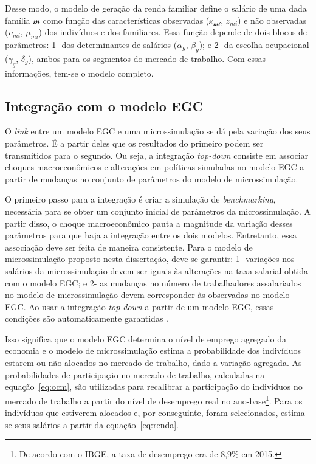 Desse modo, o modelo de geração da renda familiar define o salário de uma dada família $\mathcal{m}$ como função das características observadas ($\mathcal{x_{mi}}$, $z_{mi}$) e não observadas ($\upsilon_{mi}$, $\mu_{mi}$) dos indivíduos e dos familiares. Essa função depende de dois blocos de parâmetros: 1- dos determinantes de salários ($\alpha_g$, $\beta_g$); e 2- da escolha ocupacional ($\gamma_g$, $\delta_g$), ambos para os segmentos do mercado de trabalho. Com essas informações, tem-se o modelo completo.


\subsection{Integração com o modelo EGC}\label{subsec:integracao}

O \textit{link} entre um modelo EGC e uma microssimulação se dá pela variação dos seus parâmetros. É a partir deles que os resultados do primeiro podem ser transmitidos para o segundo. Ou seja, a integração \textit{top-down} consiste em associar choques macroeconômicos e alterações em políticas simuladas no modelo EGC a partir de mudanças no conjunto de parâmetros do modelo de microssimulação.

O primeiro passo para a integração é criar a simulação de \textit{benchmarking}, necessária para se obter um conjunto inicial de parâmetros da microssimulação. A partir disso, o choque macroeconômico pauta a magnitude da variação desses parâmetros para que haja a integração entre os dois modelos. Entretanto, essa associação deve ser feita de maneira consistente. Para o modelo de microssimulação proposto nesta dissertação, deve-se garantir: 1- variações nos salários da microssimulação devem ser iguais às alterações na taxa salarial obtida com o modelo EGC; e 2- as mudanças no número de trabalhadores assalariados no modelo de microssimulação devem corresponder às observadas no modelo EGC. Ao usar a integração \textit{top-down} a partir de um modelo EGC, essas condições são automaticamente garantidas \cite{bourguignon05, colombo08}.

Isso significa que o modelo EGC determina o nível de emprego agregado da economia e o modelo de microssimulação estima a probabilidade dos indivíduos estarem ou não alocados no mercado de trabalho, dado a variação agregada. As probabilidades de participação no mercado de trabalho, calculadas na equação~\eqref{eq:ocm}, são utilizadas para recalibrar a participação do indivíduos no mercado de trabalho a partir do nível de desemprego real no ano-base\footnote{De acordo com o IBGE, a taxa de desemprego era de 8,9\% em 2015.}. Para os indivíduos que estiverem alocados e, por conseguinte, foram selecionados, estima-se seus salários a partir da equação~\eqref{eq:renda}.

